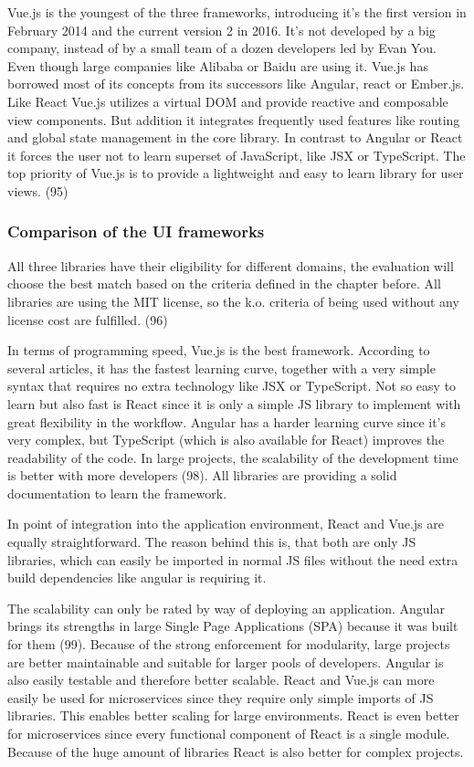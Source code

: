 \documentclass[american,a4paper,oneside,,tablecaptionabove]{scrbook}
\begin{document}
Vue.js is the youngest of the three frameworks, introducing it's the
first version in February 2014 and the current version 2 in 2016. It's
not developed by a big company, instead of by a small team of a dozen
developers led by Evan You. Even though large companies like Alibaba or
Baidu are using it. Vue.js has borrowed most of its concepts from its
successors like Angular, react or Ember.js. Like React Vue.js utilizes a
virtual DOM and provide reactive and composable view components. But
addition it integrates frequently used features like routing and global
state management in the core library. In contrast to Angular or React it
forces the user not to learn superset of JavaScript, like JSX or
TypeScript. The top priority of Vue.js is to provide a lightweight and
easy to learn library for user views. (95)

\subsubsection{Comparison of the UI
frameworks}\label{comparison-of-the-ui-frameworks}

All three libraries have their eligibility for different domains, the
evaluation will choose the best match based on the criteria defined in
the chapter before. All libraries are using the MIT license, so the k.o.
criteria of being used without any license cost are fulfilled. (96)

In terms of programming speed, Vue.js is the best framework. According
to several articles, it has the fastest learning curve, together with a
very simple syntax that requires no extra technology like JSX or
TypeScript. Not so easy to learn but also fast is React since it is only
a simple JS library to implement with great flexibility in the workflow.
Angular has a harder learning curve since it's very complex, but
TypeScript (which is also available for React) improves the readability
of the code. In large projects, the scalability of the development time
is better with more developers (98). All libraries are providing a solid
documentation to learn the framework.

In point of integration into the application environment, React and
Vue.js are equally straightforward. The reason behind this is, that both
are only JS libraries, which can easily be imported in normal JS files
without the need extra build dependencies like angular is requiring it.

The scalability can only be rated by way of deploying an application.
Angular brings its strengths in large Single Page Applications (SPA)
because it was built for them (99). Because of the strong enforcement
for modularity, large projects are better maintainable and suitable for
larger pools of developers. Angular is also easily testable and
therefore better scalable. React and Vue.js can more easily be used for
microservices since they require only simple imports of JS libraries.
This enables better scaling for large environments. React is even better
for microservices since every functional component of React is a single
module. Because of the huge amount of libraries React is also better for
complex projects.
\end{document}
